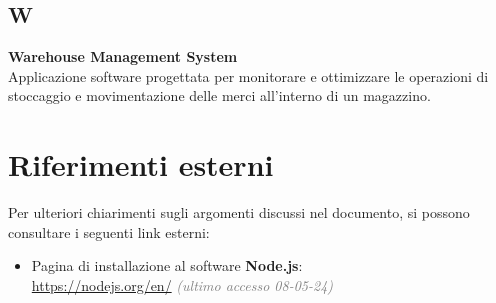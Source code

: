 \subsection*{W}
\textbf{Warehouse Management System}\\
Applicazione software progettata per monitorare e ottimizzare le operazioni di stoccaggio e movimentazione delle merci all'interno di un magazzino. 

\newpage

\section{Riferimenti esterni}\label{sec:riferimenti_esterni}
Per ulteriori chiarimenti sugli argomenti discussi nel documento, si possono consultare i seguenti link esterni:
\begin{itemize}
    \item Pagina di installazione al software \textbf{Node.js}:\\
    \url{https://nodejs.org/en/} \textcolor{gray}{\textit{(ultimo accesso 08-05-24)}}
\end{itemize}